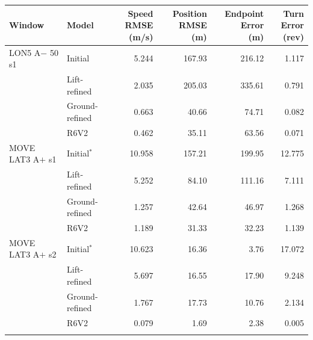 \begin{center}
\small
\setlength{\tabcolsep}{5pt}
\begin{tabular}{@{}llrrrr@{}}
\toprule
Window & Model & \shortstack{Speed RMSE\\(m/s)} & \shortstack{Position RMSE\\(m)} & \shortstack{Endpoint Error\\(m)} & \shortstack{Turn Error\\(rev)} \\
\midrule
LON5 A$-$ 50 s1 & Initial & 5.244 & 167.93 & 216.12 & 1.117 \\
 & Lift-refined & 2.035 & 205.03 & 335.61 & 0.791 \\
 & Ground-refined & 0.663 & 40.66 & 74.71 & 0.082 \\
 & R6V2 & 0.462 & 35.11 & 63.56 & 0.071 \\
\addlinespace[2pt]
MOVE LAT3 A$+$ s1 & Initial$^{*}$ & 10.958 & 157.21 & 199.95 & 12.775 \\
 & Lift-refined & 5.252 & 84.10 & 111.16 & 7.111 \\
 & Ground-refined & 1.257 & 42.64 & 46.97 & 1.268 \\
 & R6V2 & 1.189 & 31.33 & 32.23 & 1.139 \\
\addlinespace[2pt]
MOVE LAT3 A$+$ s2 & Initial$^{*}$ & 10.623 & 16.36 & 3.76 & 17.072 \\
 & Lift-refined & 5.697 & 16.55 & 17.90 & 9.248 \\
 & Ground-refined & 1.767 & 17.73 & 10.76 & 2.134 \\
 & R6V2 & 0.079 & 1.69 & 2.38 & 0.005 \\
\addlinespace[2pt]
\bottomrule
\end{tabular}
\label{tab:all_windows_1}
\end{center}
